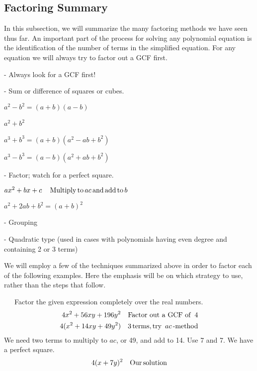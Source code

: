 \subsection{Factoring Summary}

{}\pp

In this subsection, we will summarize the many 
factoring methods we have seen thus far. An important part of the process for solving any polynomial equation
is the identification of the number of terms in the simplified equation. For any equation we will
always try to factor out a GCF first.

\begin{center}
  {}
\end{center}
\begin{itemizedot}
	\item {} - Always look for a GCF first!
  \item {} - Sum or difference of squares or cubes.
  
 $ a^2 - b^2 = (a + b) (a - b)$
  
  $a^2 + b^2$~~~
  
 $ a^3 + b^3 = (a + b) (a^2 - a b + b^2)$
  
  $a^3 - b^3 = (a - b) (a^2 + ab + b^2)$
  
  \item {} - Factor; watch for a perfect square.
  
  $ax^2+bx+c~~~\operatorname{Multiply} \operatorname{to} a c \operatorname{and} \operatorname{add} \operatorname{to} b$
  
	$a^2 + 2 a b + b^2 = (a + b)^2$
    
  \item {} - Grouping
	\item {} - Quadratic type (used in cases with polynomials having even degree and containing 2 or 3 terms)

\end{itemizedot}
We will employ a few of the techniques summarized above in order to factor each of the following examples. Here
the emphasis will be on which strategy to use, rather than the steps that follow.
\begin{example}~~~Factor the given expression completely over the real numbers.
  \begin{eqnarray*}
    4 x^2 + 56 x y + 196 y^2 &  & \operatorname{Factor~out~a~GCF~of~} 4\\
    4 (x^2 + 14 x y + 49 y^2) &  & 3 \operatorname{terms}, \operatorname{try~} ac\operatorname{-method}
	\end{eqnarray*}
	We need two terms to multiply to $ac$, or 49, and add to 14.  Use 7 and 7.  We have a perfect square.
  \begin{eqnarray*}
		4 (x + 7 y)^2 &  & \operatorname{Our} \operatorname{solution}
  \end{eqnarray*}
\end{example}

